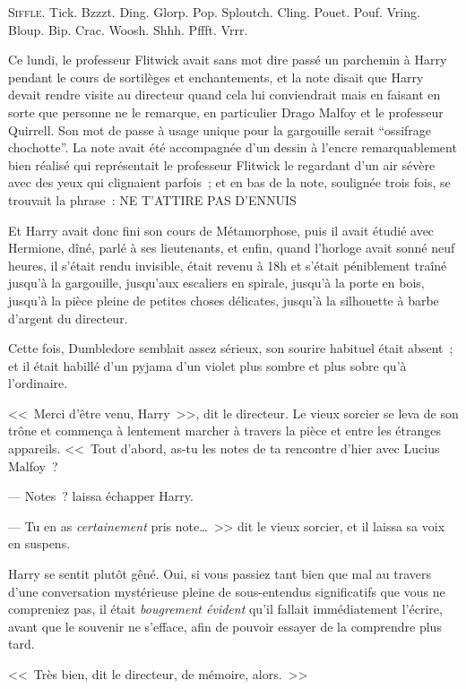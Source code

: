 
\lettrine{S}{iffle}.  Tick. Bzzzt. Ding. Glorp. Pop. Sploutch. Cling. Pouet. Pouf. Vring. Bloup. Bip. Crac. Woosh. Shhh. Pffft. Vrrr.

Ce lundi, le professeur Flitwick avait sans mot dire passé un parchemin à Harry pendant le cours de sortilèges et enchantements, et la note disait que Harry devait rendre visite au directeur quand cela lui conviendrait mais en faisant en sorte que personne ne le remarque, en particulier Drago Malfoy et le professeur Quirrell. Son mot de passe à usage unique pour la gargouille serait “ossifrage chochotte”. La note avait été accompagnée d'un dessin à l'encre remarquablement bien réalisé qui représentait le professeur Flitwick le regardant d'un air sévère avec des yeux qui clignaient parfois~; et en bas de la note, soulignée trois fois, se trouvait la phrase~: NE T'ATTIRE PAS D'ENNUIS

Et Harry avait donc fini son cours de Métamorphose, puis il avait étudié avec Hermione, dîné, parlé à ses lieutenants, et enfin, quand l'horloge avait sonné neuf heures, il s'était rendu invisible, était revenu à 18h et s'était péniblement traîné jusqu'à la gargouille, jusqu'aux escaliers en spirale, jusqu'à la porte en bois, jusqu'à la pièce pleine de petites choses délicates, jusqu'à la silhouette à barbe d'argent du directeur.

Cette fois, Dumbledore semblait assez sérieux, son sourire habituel était absent~; et il était habillé d'un pyjama d'un violet plus sombre et plus sobre qu'à l'ordinaire.

<<~Merci d'être venu, Harry~>>, dit le directeur. Le vieux sorcier se leva de son trône et commença à lentement marcher à travers la pièce et entre les étranges appareils. <<~Tout d'abord, as-tu les notes de ta rencontre d'hier avec Lucius Malfoy~?

--- Notes~? laissa échapper Harry.

--- Tu en as \emph{certainement} pris note…~>> dit le vieux sorcier, et il laissa sa voix en suspens.

Harry se sentit plutôt gêné. Oui, si vous passiez tant bien que mal au travers d'une conversation mystérieuse pleine de sous-entendus significatifs que vous ne compreniez pas, il était \emph{bougrement évident} qu'il fallait immédiatement l'écrire, avant que le souvenir ne s'efface, afin de pouvoir essayer de la comprendre plus tard.

<<~Très bien, dit le directeur, de mémoire, alors.~>>

